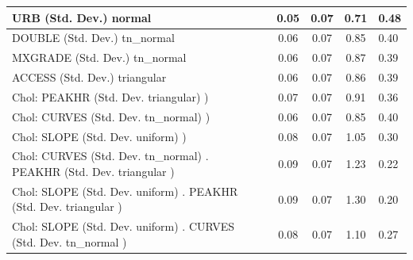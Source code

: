 \begin{table}
\begin{center}
\begin{tabular}{|l|l|c|c|c|l|}
			\hline
			URB (Std. Dev.) normal &  & 0.05 & 0.07 & 0.71 & 0.48 \\
			\hline
			DOUBLE (Std. Dev.) tn_normal &  & 0.06 & 0.07 & 0.85 & 0.40 \\
			\hline
			MXGRADE (Std. Dev.) tn_normal &  & 0.06 & 0.07 & 0.87 & 0.39 \\
			\hline
			ACCESS (Std. Dev.) triangular &  & 0.06 & 0.07 & 0.86 & 0.39 \\
			\hline
			 Chol: PEAKHR (Std. Dev. triangular) ) &  & 0.07 & 0.07 & 0.91 & 0.36 \\
			\hline
			 Chol: CURVES (Std. Dev. tn_normal) ) &  & 0.06 & 0.07 & 0.85 & 0.40 \\
			\hline
			 Chol: SLOPE (Std. Dev. uniform) ) &  & 0.08 & 0.07 & 1.05 & 0.30 \\
			\hline
			 Chol: CURVES (Std. Dev. tn_normal) . PEAKHR (Std. Dev.   triangular ) &  & 0.09 & 0.07 & 1.23 & 0.22 \\
			\hline
			 Chol: SLOPE (Std. Dev. uniform) . PEAKHR (Std. Dev.   triangular ) &  & 0.09 & 0.07 & 1.30 & 0.20 \\
			\hline
			 Chol: SLOPE (Std. Dev. uniform) . CURVES (Std. Dev.   tn_normal ) &  & 0.08 & 0.07 & 1.10 & 0.27 \\
			\hline
		\end{tabular}
	\end{center}
\end{table}